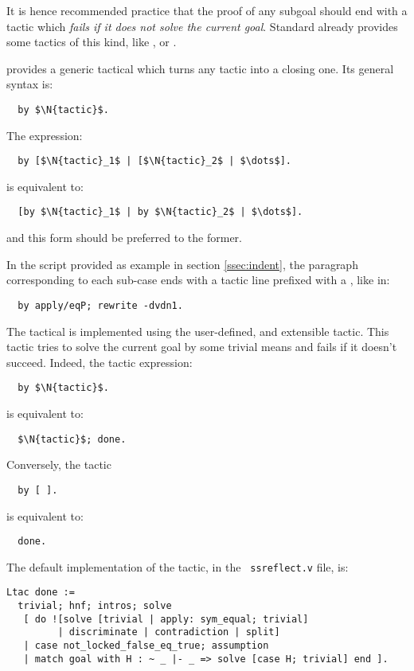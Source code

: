 It is hence recommended practice that the proof of any subgoal should
end with a tactic which \emph{fails if it does not solve the current
  goal}. Standard \Coq{} already provides some tactics of this kind,
like ,  or .

\ssr{} provides a generic tactical which turns any tactic into a closing
one. Its general syntax is:
\begin{lstlisting}
  by $\N{tactic}$.
\end{lstlisting}
The \Ltac{} expression:
\begin{lstlisting}
  by [$\N{tactic}_1$ | [$\N{tactic}_2$ | $\dots$].
\end{lstlisting}
is equivalent to:
\begin{lstlisting}
  [by $\N{tactic}_1$ | by $\N{tactic}_2$ | $\dots$].
\end{lstlisting}
and this form should be preferred to the former.

In the script provided as example in section \ref{ssec:indent}, the
paragraph corresponding to each sub-case ends with a tactic line prefixed
with a , like in:
\begin{lstlisting}
  by apply/eqP; rewrite -dvdn1.
\end{lstlisting}

The  tactical is implemented using the user-defined,
and extensible  tactic. This  tactic tries to solve
the current goal by some trivial means and fails if it doesn't succeed.
Indeed, the tactic expression:
\begin{lstlisting}
  by $\N{tactic}$.
\end{lstlisting}
is equivalent to:
\begin{lstlisting}
  $\N{tactic}$; done.
\end{lstlisting}
Conversely, the tactic
\begin{lstlisting}
  by [ ].
\end{lstlisting}
is equivalent to:
\begin{lstlisting}
  done.
\end{lstlisting}
The default implementation of the  tactic, in the {\tt
  ssreflect.v} file, is:

\begin{lstlisting}
Ltac done :=
  trivial; hnf; intros; solve
   [ do ![solve [trivial | apply: sym_equal; trivial]
         | discriminate | contradiction | split]
   | case not_locked_false_eq_true; assumption
   | match goal with H : ~ _ |- _ => solve [case H; trivial] end ].
\end{lstlisting}

